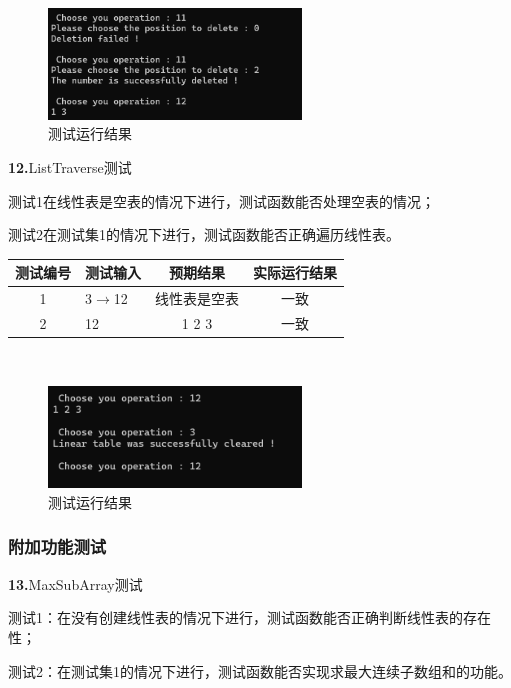 \documentclass[supercite]{Experimental_Report}
\theoremstyle{definition}
\begin{document}
 \begin{figure}[H]
 	\centering
 	\includegraphics[width=0.6\textwidth]{images/线性表测试11.png}
 	\caption{测试运行结果}
 	\label{txlab}
 \end{figure}


\noindent\textbf{12.}ListTraverse测试

	测试1在线性表是空表的情况下进行，测试函数能否处理空表的情况；

	测试2在测试集1的情况下进行，测试函数能否正确遍历线性表。

\vspace{0.5em}

\begin{tabular}{|c|p{2.7cm}|c|c|}
	\hline
	测试编号 & 测试输入 & 预期结果 & 实际运行结果 \\
	\hline
	1 & 3$\rightarrow$12 & 线性表是空表 & 一致 \\
	\hline
	2 & 12 & 1 2 3 & 一致 \\
	\hline
\end{tabular}

~\

 \begin{figure}[H]
 	\centering
 	\includegraphics[width=0.6\textwidth]{images/线性表测试12.png}
 	\caption{测试运行结果}
 	\label{txlab}
 \end{figure}


\subsubsection{附加功能测试}

\noindent\textbf{13.}MaxSubArray测试

测试1：在没有创建线性表的情况下进行，测试函数能否正确判断线性表的存在性；
	
测试2：在测试集1的情况下进行，测试函数能否实现求最大连续子数组和的功能。
\end{document}
